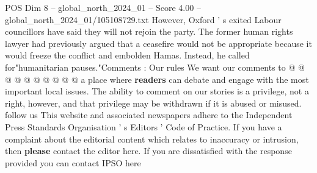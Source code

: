 \begin{textsample}{POS Dim 8 – global\_north\_2024\_01 – Score 4.00 – global\_north\_2024\_01/105108729.txt}
However, Oxford ' s exited Labour councillors have said they will not rejoin the party.
The former human rights lawyer had previously argued that a ceasefire would not be appropriate because it would freeze the conflict and embolden Hamas.
Instead, he called for"humanitarian pauses."Comments : Our rules We want our comments to @ @ @ @ @ @ @ @ @ @ a place where \textbf{readers} can debate and engage with the most important local issues.
The ability to comment on our stories is a privilege, not a right, however, and that privilege may be withdrawn if it is abused or misused. follow us This website and associated newspapers adhere to the Independent Press Standards Organisation ' s Editors ' Code of Practice.
If you have a complaint about the editorial content which relates to inaccuracy or intrusion, then \textbf{please} contact the editor here.
If you are dissatisfied with the response provided you can contact IPSO here

\end{textsample}
